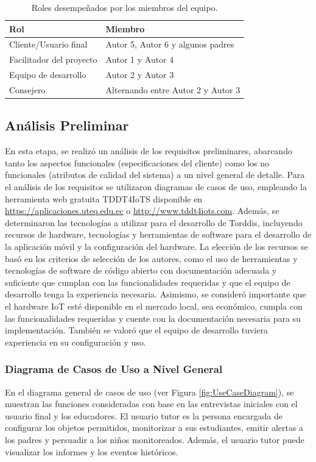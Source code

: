\documentclass[a4paper,fleqn]{cas-sc}
\begin{document}
		\begin{table}[H]
			\caption{Roles desempeñados por los miembros del equipo.\label{tab:Roles}}
			\begin{tabularx}{0.8\textwidth}{>{\arraybackslash}X >{\arraybackslash}X}
				\toprule
				\textbf{Rol}	& \textbf{Miembro}\\
				\midrule
				Cliente/Usuario final & Autor 5, Autor 6 y algunos padres\\
				Facilitador del proyecto		&  Autor 1 y Autor 4\\
				Equipo de desarrollo		&  Autor 2 y Autor 3\\
				Consejero		&  Alternando entre Autor 2 y Autor 3\\
				\bottomrule
			\end{tabularx}
		\end{table}
		
		\subsection{Análisis Preliminar}
		En esta etapa, se realizó un análisis de los requisitos preliminares, abarcando tanto los aspectos funcionales (especificaciones del cliente) como los no funcionales (atributos de calidad del sistema) a un nivel general de detalle. Para el análisis de los requisitos se utilizaron diagramas de casos de uso, empleando la herramienta web gratuita TDDT4IoTS disponible en \href{https://aplicaciones.uteq.edu.ec}{https://aplicaciones.uteq.edu.ec} o \href{http://www.tddt4iots.com}{http://www.tddt4iots.com}. Además, se determinaron las tecnologías a utilizar para el desarrollo de Torddis, incluyendo recursos de hardware, tecnologías y herramientas de software para el desarrollo de la aplicación móvil y la configuración del hardware. La elección de los recursos se basó en los criterios de selección de los autores, como el uso de herramientas y tecnologías de software de código abierto con documentación adecuada y suficiente que cumplan con las funcionalidades requeridas y que el equipo de desarrollo tenga la experiencia necesaria. Asimismo, se consideró importante que el hardware IoT esté disponible en el mercado local, sea económico, cumpla con las funcionalidades requeridas y cuente con la documentación necesaria para su implementación. También se valoró que el equipo de desarrollo tuviera experiencia en su configuración y uso.
	
		\subsubsection{Diagrama de Casos de Uso a Nivel General}
		En el diagrama general de casos de uso (ver Figura \ref{fig:UseCaseDiagram}), se muestran las funciones consideradas con base en las entrevistas iniciales con el usuario final y los educadores. El usuario tutor es la persona encargada de configurar los objetos permitidos, monitorizar a sus estudiantes, emitir alertas a los padres y persuadir a los niños monitoreados. Además, el usuario tutor puede visualizar los informes y los eventos históricos.
		
\end{document}
